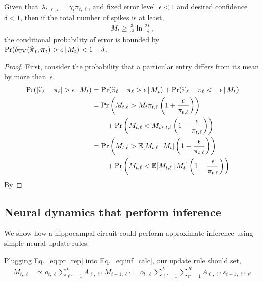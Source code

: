 \begin{theorem}
Given that~$\lambda_{t,\ell,r} = \gamma_t \pi_{t,\ell}$, and fixed 
error level~$\epsilon < 1$ and desired confidence~$\delta < 1$, 
then if the total number of spikes is at 
least,
\begin{align}
M_t \geq \frac{3}{\epsilon^2} \ln \frac{2L}{\delta},  
\end{align}
the conditional probability of error is bounded 
by~$\Pr(\delta_{\mathrm{TV}}(\widehat{\boldsymbol{\pi}}_t, \boldsymbol{\pi}_t) > \epsilon \,|\, M_t) < 1-\delta$.
\end{theorem}

\begin{proof}
First, consider the probability that a particular entry differs from its mean by more than~$\epsilon$.
\begin{align}
  \Pr(|\widehat{\pi}_\ell - \pi_\ell |  > \epsilon \,|\, M_t) &=
  \Pr(\widehat{\pi}_\ell - \pi_\ell  > \epsilon \,|\, M_t) + 
  \Pr(\widehat{\pi}_\ell - \pi_\ell  < -\epsilon \,|\, M_t) \\
  \nonumber  &= \Pr \left(M_{t, \ell} > M_t \pi_{t, \ell} \left(1+\frac{\epsilon}{\pi_{t, \ell}} \right) \right) \\
  &\qquad +\Pr \left(M_{t, \ell} < M_t \pi_{t, \ell} \left(1-\frac{\epsilon}{\pi_{t, \ell}} \right) \right) \\
  \nonumber  &= \Pr \left(M_{t, \ell} > \mathbb{E}[M_{t,\ell} \,|\, M_t] \left(1+\frac{\epsilon}{\pi_{t, \ell}} \right) \right) \\
  &\qquad +\Pr \left(M_{t, \ell} < \mathbb{E}[M_{t,\ell} \,|\, M_t] \left(1-\frac{\epsilon}{\pi_{t, \ell}} \right) \right)
\end{align}
By


\end{proof}


\subsection{Neural dynamics that perform inference}

We show how a hippocampal circuit could perform approximate inference using 
simple neural update rules. 

Plugging Eq.~\ref{eq:pr_rep} into Eq.~\ref{eq:inf_calc}, our update rule should set,
\begin{align}
  \label{eq:pop_update}
  M_{t,\ell} 
  &\propto o_{t,\ell} \sum_{\ell'=1}^L A_{\ell, \ell'} \, M_{t-1, \ell'}
  = o_{t, \ell} \sum_{\ell'=1}^L \sum_{r'=1}^R A_{\ell, \ell'} \, s_{t-1, \ell', r'}
\end{align}


